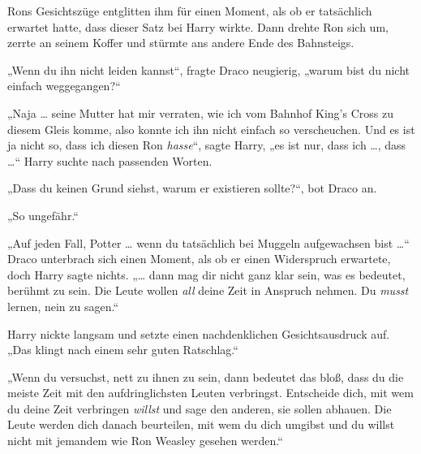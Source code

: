Rons Gesichtszüge entglitten ihm für einen Moment, als ob er tatsächlich erwartet hatte, dass dieser Satz bei Harry wirkte. Dann drehte Ron sich um, zerrte an seinem Koffer und stürmte ans andere Ende des Bahnsteigs.

„Wenn du ihn nicht leiden kannst“, fragte Draco neugierig, „warum bist du nicht einfach weggegangen?“

„Naja … seine Mutter hat mir verraten, wie ich vom Bahnhof King’s Cross zu diesem Gleis komme, also konnte ich ihn nicht einfach so verscheuchen. Und es ist ja nicht so, dass ich diesen Ron \emph{hasse}“, sagte Harry, „es ist nur, dass ich …, dass …“ Harry suchte nach passenden Worten.

„Dass du keinen Grund siehst, warum er existieren sollte?“, bot Draco an.

„So ungefähr.“

„Auf jeden Fall, Potter … wenn du tatsächlich bei Muggeln aufgewachsen bist …“ Draco unterbrach sich einen Moment, als ob er einen Widerspruch erwartete, doch Harry sagte nichts. „… dann mag dir nicht ganz klar sein, was es bedeutet, berühmt zu sein. Die Leute wollen \emph{all} deine Zeit in Anspruch nehmen. Du \emph{musst} lernen, nein zu sagen.“

Harry nickte langsam und setzte einen nachdenklichen Gesichtsausdruck auf.
„Das klingt nach einem sehr guten Ratschlag.“

„Wenn du versuchst, nett zu ihnen zu sein, dann bedeutet das bloß, dass du die meiste Zeit mit den aufdringlichsten Leuten verbringst. Entscheide dich, mit wem du deine Zeit verbringen \emph{willst} und sage den anderen, sie sollen abhauen. Die Leute werden dich danach beurteilen, mit wem du dich umgibst und du willst nicht mit jemandem wie Ron Weasley gesehen werden.“


